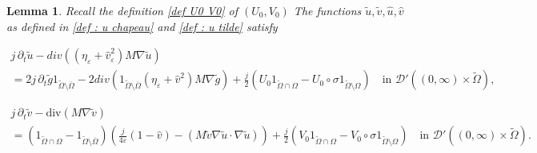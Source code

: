 \documentclass[reqno,12pt,twoside]{amsart}
\newtheorem{lemma}{Lemma}[section]
\numberwithin{equation}{section} \numberwithin{theorem}{section}
\numberwithin{proposition}{section} \numberwithin{lemma}{section}
\numberwithin{corollary}{section}
\numberwithin{definition}{section} \numberwithin{remark}{section}
\begin{document}
\begin{lemma}
Recall the definition \eqref{def U0 V0} of $(U_0, V_0)$
The functions $\widetilde{u}, \widetilde{v}, \hat{u}, \hat{v}$ as defined in \eqref{def : u chapeau} and \eqref{def : u tilde} satisfy 

\begin{multline}\label{boundary : equ}
j\, \partial_t \widetilde{u} - div((\eta_\varepsilon + \hat{v}^2_\varepsilon ) M\nabla \widetilde{u} )\\
 = 2j\, \partial_t \widetilde{g} 1_{\widetilde{\Omega}\setminus \overline{\Omega}} - 2 div(1_{\widetilde{\Omega}\setminus \overline{\Omega}} (\eta_\varepsilon + \hat{v}^2) M \nabla \widetilde{g})+ \frac{j}{2}(U_0 1_{\widetilde{\Omega}\cap \Omega} - U_0\circ \sigma  1_{\widetilde{\Omega}\setminus \Omega}) \quad \text{in } \mathcal{D}'((0,\infty) \times \widetilde{\Omega}),
\end{multline}


\begin{multline}\label{boundary : eqv}
j\, \partial_t \widetilde{v} - \text{div}(M\nabla \widetilde{v})\\
 =(1_{\widetilde{\Omega} \cap \Omega} - 1_{\widetilde{\Omega}\setminus \overline{\Omega}}) \left( \frac{j}{4\varepsilon} (1-\hat{v}) - (M \widetilde{v} \nabla \widetilde{u} \cdot \nabla \widetilde{u})\right) + \frac{j}{2}(V_0 1_{\widetilde{\Omega}\cap \Omega} - V_0\circ \sigma  1_{\widetilde{\Omega}\setminus \Omega}) \quad \text{in } \mathcal{D}'((0,\infty) \times \widetilde{\Omega}).
\end{multline}
\end{lemma}
\end{document}
